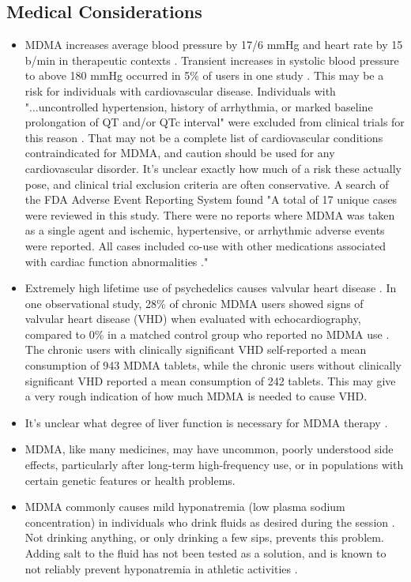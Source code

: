 \documentclass[12pt,letterpaper]{book}
\begin{document}
\subsection*{Medical Considerations}
\begin{itemize}
    \item MDMA increases average blood pressure by 17/6 mmHg and heart rate by 15 b/min in therapeutic contexts \cite{mitchellMDMAClinicalTrial}. Transient increases in systolic blood pressure to above 180 mmHg occurred in 5\% of users in one study \cite{vizeliActuteEffects}. This may be a risk for individuals with cardiovascular disease. Individuals with "...uncontrolled hypertension, history of arrhythmia, or marked baseline prolongation of QT and/or QTc interval" were excluded from clinical trials for this reason \cite{mitchellMDMAClinicalTrial2}. That may not be a complete list of cardiovascular conditions contraindicated for MDMA, and caution should be used for any cardiovascular disorder. It's unclear exactly how much of a risk these actually pose, and clinical trial exclusion criteria are often conservative. A search of the FDA Adverse Event Reporting System found "A total of 17 unique cases were reviewed in this study. There were no reports where MDMA was taken as a single agent and ischemic, hypertensive, or arrhythmic adverse events were reported. All cases included co-use with other medications associated with cardiac function abnormalities \cite{makunts2023concomitant}."
    \item Extremely high lifetime use of psychedelics causes valvular heart disease \cite{droogmans2007valvular,tagen2023valvular}. In one observational study, 28\% of chronic MDMA users showed signs of valvular heart disease (VHD) when evaluated with echocardiography, compared to 0\% in a matched control group who reported no MDMA use \cite{droogmans2007valvular}. The chronic users with clinically significant VHD self-reported a mean consumption of 943 MDMA tablets, while the chronic users without clinically significant VHD reported a mean consumption of 242 tablets. This may give a very rough indication of how much MDMA is needed to cause VHD.
    \item It's unclear what degree of liver function is necessary for MDMA therapy \cite{krausCirrhosis}.
    \item MDMA, like many medicines, may have uncommon, poorly understood side effects, particularly after long-term high-frequency use, or in populations with certain genetic features or health problems.
    \item MDMA commonly causes mild hyponatremia (low plasma sodium concentration) in individuals who drink fluids as desired during the session \cite{atilaHyponatremia,baggottWater}. Not drinking anything, or only drinking a few sips, prevents this problem. Adding salt to the fluid has not been tested as a solution, and is known to not reliably prevent hyponatremia in athletic activities \cite{hew2008statement}.

\end{itemize}
\end{document}
